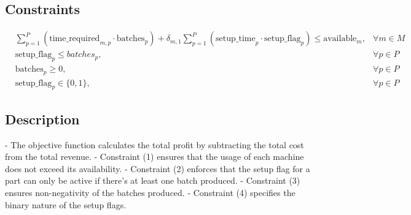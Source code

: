 \documentclass{article}
\begin{document}
\subsection*{Constraints}
\begin{align}
& \sum_{p=1}^{P} (\text{time\_required}_{m,p} \cdot \text{batches}_p) + \delta_{m,1} \sum_{p=1}^{P} (\text{setup\_time}_p \cdot \text{setup\_flag}_p) \leq \text{available}_m, & \forall m \in M \\
& \text{setup\_flag}_p \leq batches_p, & \forall p \in P \\
& \text{batches}_p \geq 0, & \forall p \in P \\
& \text{setup\_flag}_p \in \{0, 1\}, & \forall p \in P 
\end{align}

\subsection*{Description}

- The objective function calculates the total profit by subtracting the total cost from the total revenue.
- Constraint (1) ensures that the usage of each machine does not exceed its availability.
- Constraint (2) enforces that the setup flag for a part can only be active if there's at least one batch produced.
- Constraint (3) ensures non-negativity of the batches produced.
- Constraint (4) specifies the binary nature of the setup flags.
\end{document}
